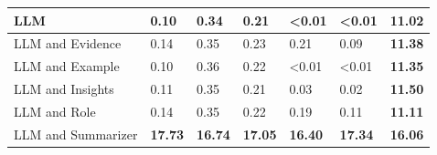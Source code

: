 \begin{tabular}{|l|l|l|l|l|l|l|}
 \hline
 LLM & 0.10 & 0.34 & 0.21 & \textless{}0.01 & \textless{}0.01 & \textbf{11.02} \\
 \hline
 LLM and Evidence & 0.14 & 0.35 & 0.23 & 0.21 & 0.09 & \textbf{11.38} \\
 \hline
 LLM and Example & 0.10 & 0.36 & 0.22 & \textless{}0.01 & \textless{}0.01 & \textbf{11.35} \\
 \hline
 LLM and Insights & 0.11 & 0.35 & 0.21 & 0.03 & 0.02 & \textbf{11.50} \\
 \hline
 LLM and Role & 0.14 & 0.35 & 0.22 & 0.19 & 0.11 & \textbf{11.11} \\
 \hline
 LLM and Summarizer & \textbf{17.73} & \textbf{16.74} & \textbf{17.05} & \textbf{16.40} & \textbf{17.34} & \textbf{16.06} \\
\hline
\end{tabular}
